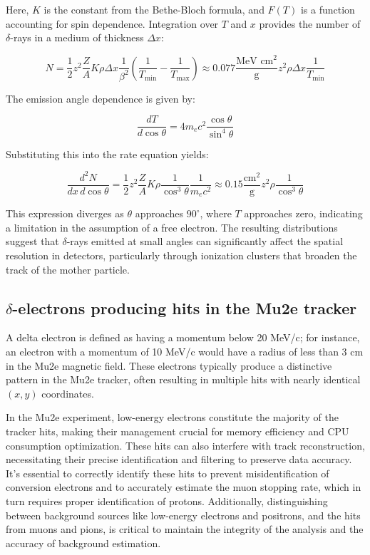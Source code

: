 Here, $K$ is the constant from the Bethe-Bloch formula, 
and $F(T)$ is a function accounting for spin dependence. 
Integration over $T$ and $x$ provides the number of $\delta$-rays in a medium of thickness $\Delta x$:

\begin{equation}
N = \frac{1}{2} z^2 \frac{Z}{A} K \rho \Delta x \frac{1}{\beta^2} \left(\frac{1}{T_{\text{min}}} - \frac{1}{T_{\text{max}}}\right) \approx 0.077 \frac{\text{MeV cm}^2}{\text{g}} z^2 \rho \Delta x \frac{1}{T_{\text{min}}}
\end{equation}

The emission angle dependence is given by:

\begin{equation}
\frac{dT}{d \cos \theta} = 4 m_e c^2 \frac{\cos \theta}{\sin^4 \theta}
\end{equation}

Substituting this into the rate equation yields:

\begin{equation}
\frac{d^2 N}{dx \, d \cos \theta} = \frac{1}{2} z^2 \frac{Z}{A} K \rho \frac{1}{\cos^3 \theta} \frac{1}{m_e c^2} \approx 0.15 \frac{\text{cm}^2}{\text{g}} z^2 \rho \frac{1}{\cos^3 \theta}
\end{equation}

This expression diverges as $\theta$ approaches $90^\circ$, 
where $T$ approaches zero, indicating a limitation in the 
assumption of a free electron. The resulting distributions 
suggest that $\delta$-rays emitted at small angles can 
significantly affect the spatial resolution in detectors, 
particularly through ionization clusters that broaden the 
track of the mother particle.


\subsection{$\delta$-electrons producing hits in the Mu2e tracker}
A delta electron is defined as having a momentum below 20 MeV/c; for instance, an 
electron with a momentum of 10 MeV/c would have a radius of less than 3 cm in the 
Mu2e magnetic field. These electrons typically produce a distinctive pattern in the 
Mu2e tracker, often resulting in multiple hits with nearly identical $(x, y)$ coordinates.

In the Mu2e experiment, low-energy electrons constitute the majority of the tracker hits, 
making their management crucial for memory efficiency and CPU consumption optimization. 
These hits can also interfere with 
track reconstruction, necessitating their precise identification and filtering to preserve 
data accuracy. It's essential to correctly identify these hits to prevent misidentification 
of conversion electrons and to accurately estimate the muon stopping rate, which in turn 
requires proper identification of protons. Additionally, distinguishing between background 
sources like low-energy electrons and positrons, and the hits from muons and pions, is 
critical to maintain the integrity of the analysis and the accuracy of background estimation.

